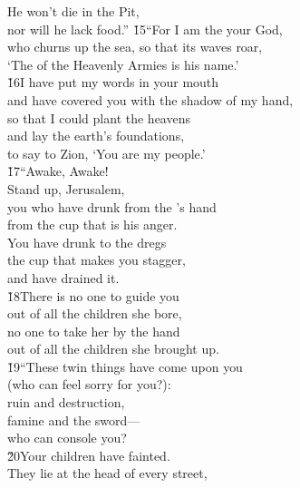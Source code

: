 \begin{poetry}
\poemll    He won't die in the Pit, \\
\poemlll       nor will he lack food.''
\poeml \v{15}``For I am the  your God, \\
\poemll    who churns up the sea, so that its waves roar, \\
\poemlll       `The  of the Heavenly Armies is his name.' \\
\poeml \v{16}I have put my words in your mouth \\
\poemll    and have covered you with the shadow of my hand, \\
\poeml so that I could plant the heavens \\
\poemll    and lay the earth's foundations, \\
\poemlll       to say to Zion, `You are my people.' \\
\poeml \v{17}``Awake, Awake! \\
\poemll    Stand up, Jerusalem, \\
\poeml you who have drunk from the 's hand \\
\poemll    from the cup that is his anger. \\
\poeml You have drunk to the dregs \\
\poemll    the cup that makes you stagger, \\
\poemlll       and have drained it. \\
\poeml \v{18}There is no one to guide you \\
\poemll    out of all the children she bore, \\
\poeml no one to take her by the hand \\
\poemll    out of all the children she brought up. \\
\poeml \v{19}``These twin things have come upon you \\
\poemll    (who can feel sorry for you?): \\
\poeml ruin and destruction, \\
\poemll    famine and the sword--- \\
\poemlll       who can console you? \\
\poeml \v{20}Your children have fainted. \\
\poemll    They lie at the head of every street, \\

\end{poetry}
